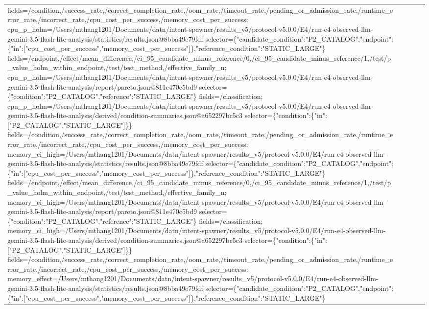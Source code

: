 \begin{tabular}{lllll}
fields=/condition,/success\_rate,/correct\_completion\_rate,/oom\_rate,/timeout\_rate,/pending\_or\_admission\_rate,/runtime\_error\_rate,/incorrect\_rate,/cpu\_cost\_per\_success,/memory\_cost\_per\_success; cpu\_p\_holm=/Users/mthang1201/Documents/datn/intent-spawner/results\_v5/protocol-v5.0.0/E4/run-e4-observed-llm-gemini-3.5-flash-lite-analysis/statistics/results.json@8bba49e79fdf selector=\{"candidate\_condition":"P2\_CATALOG","endpoint":\{"in":["cpu\_cost\_per\_success","memory\_cost\_per\_success"]\},"reference\_condition":"STATIC\_LARGE"\} fields=/endpoint,/effect/mean\_difference,/ci\_95\_candidate\_minus\_reference/0,/ci\_95\_candidate\_minus\_reference/1,/test/p\_value\_holm\_within\_endpoint,/test/test\_method,/effective\_family\_n; cpu\_p\_holm=/Users/mthang1201/Documents/datn/intent-spawner/results\_v5/protocol-v5.0.0/E4/run-e4-observed-llm-gemini-3.5-flash-lite-analysis/report/pareto.json@811e470c5bd9 selector=\{"condition":"P2\_CATALOG","reference":"STATIC\_LARGE"\} fields=/classification; cpu\_p\_holm=/Users/mthang1201/Documents/datn/intent-spawner/results\_v5/protocol-v5.0.0/E4/run-e4-observed-llm-gemini-3.5-flash-lite-analysis/derived/condition-summaries.json@a652297bc5c3 selector=\{"condition":\{"in":["P2\_CATALOG","STATIC\_LARGE"]\}\} fields=/condition,/success\_rate,/correct\_completion\_rate,/oom\_rate,/timeout\_rate,/pending\_or\_admission\_rate,/runtime\_error\_rate,/incorrect\_rate,/cpu\_cost\_per\_success,/memory\_cost\_per\_success; memory\_ci\_high=/Users/mthang1201/Documents/datn/intent-spawner/results\_v5/protocol-v5.0.0/E4/run-e4-observed-llm-gemini-3.5-flash-lite-analysis/statistics/results.json@8bba49e79fdf selector=\{"candidate\_condition":"P2\_CATALOG","endpoint":\{"in":["cpu\_cost\_per\_success","memory\_cost\_per\_success"]\},"reference\_condition":"STATIC\_LARGE"\} fields=/endpoint,/effect/mean\_difference,/ci\_95\_candidate\_minus\_reference/0,/ci\_95\_candidate\_minus\_reference/1,/test/p\_value\_holm\_within\_endpoint,/test/test\_method,/effective\_family\_n; memory\_ci\_high=/Users/mthang1201/Documents/datn/intent-spawner/results\_v5/protocol-v5.0.0/E4/run-e4-observed-llm-gemini-3.5-flash-lite-analysis/report/pareto.json@811e470c5bd9 selector=\{"condition":"P2\_CATALOG","reference":"STATIC\_LARGE"\} fields=/classification; memory\_ci\_high=/Users/mthang1201/Documents/datn/intent-spawner/results\_v5/protocol-v5.0.0/E4/run-e4-observed-llm-gemini-3.5-flash-lite-analysis/derived/condition-summaries.json@a652297bc5c3 selector=\{"condition":\{"in":["P2\_CATALOG","STATIC\_LARGE"]\}\} fields=/condition,/success\_rate,/correct\_completion\_rate,/oom\_rate,/timeout\_rate,/pending\_or\_admission\_rate,/runtime\_error\_rate,/incorrect\_rate,/cpu\_cost\_per\_success,/memory\_cost\_per\_success; memory\_effect=/Users/mthang1201/Documents/datn/intent-spawner/results\_v5/protocol-v5.0.0/E4/run-e4-observed-llm-gemini-3.5-flash-lite-analysis/statistics/results.json@8bba49e79fdf selector=\{"candidate\_condition":"P2\_CATALOG","endpoint":\{"in":["cpu\_cost\_per\_success","memory\_cost\_per\_success"]\},"reference\_condition":"STATIC\_LARGE"\} 
\end{tabular}
